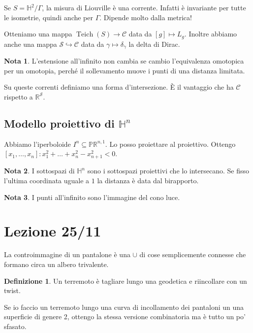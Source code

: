 \documentclass[a4paper]{article}
\theoremstyle{definition}
\newtheorem{definition}{Definizione}
\newtheorem{remark}{Nota}
\DeclareMathOperator{\Teich}{Teich}
\begin{document}
    Se $S = \mathbb H^2 /\Gamma$, la misura di Liouville è una corrente. Infatti è invariante per tutte le isometrie, quindi anche per $\Gamma$. Dipende molto dalla metrica!

    Otteniamo una mappa $\Teich(S) \to \mathcal C$ data da $[g] \mapsto L_{g}$. Inoltre abbiamo anche una mappa $\mathcal S \hookrightarrow \mathcal C$ data da $\gamma \mapsto \delta_{\gamma}$ la delta di Dirac.

    \begin{remark}
        L'estensione all'infinito non cambia se cambio l'equivalenza omotopica per un omotopia, perché il sollevamento muove i punti di una distanza limitata.
    \end{remark}
    
    Su queste correnti definiamo una forma d'intersezione. È il vantaggio che ha $\mathcal C$ rispetto a $\mathbb R^{\mathcal S}$.

\subsection{Modello proiettivo di $\mathbb H^n$}

    Abbiamo l'iperboloide $I^{n} \subseteq \mathbb{PR}^{n,1}$. Lo posso proiettare al proiettivo. Ottengo $[x_1, \ldots, x_n] : x_1^2 + \ldots + x_n^2 - x_{n+1}^2 < 0$.
    \begin{remark}
        I sottospazi di $\mathbb H^n$ sono i sottospazi proiettivi che lo intersecano. Se fisso l'ultima coordinata uguale a $1$ la distanza è data dal birapporto.
    \end{remark}

    \begin{remark}
        I punti all'infinito sono l'immagine del cono luce.
    \end{remark}

\section{Lezione 25/11}

La controimmagine di un pantalone è una $\cup$ di cose semplicemente connesse che formano circa un albero trivalente.

\begin{definition}
    Un terremoto è tagliare lungo una geodetica e riincollare con un twist.
\end{definition}

Se io faccio un terremoto lungo una curva di incollamento dei pantaloni un una superficie di genere 2, ottengo la stessa versione combinatoria ma è tutto un po' sfasato.
\end{document}
